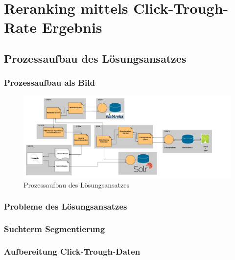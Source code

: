 %
\chapter{Reranking mittels Click-Trough-Rate Ergebnis}
\label{sec:Reranking}


\section{Prozessaufbau des Lösungsansatzes}
\label{sec:Reranking:Prozessaufbau}

\subsection{Prozessaufbau als Bild}
\label{sec:Reranking:Prozessaufbau:ProzessaufbauBild}

\begin{figure}[H]
\centering
\includegraphics[width=0.5\linewidth]{gfx/Prozessaufbau}
\caption[Prozessaufbau des Lösungsansatzes]{Prozessaufbau des Lösungsansatzes}
\label{fig:Prozessaufbau}
\vspace{-2.5em}
\end{figure}

\subsection{Probleme des Lösungsansatzes}
\label{sec:Reranking:Prozessaufbau}

\subsection{Suchterm Segmentierung}
\label{sec:Reranking:Prozessaufbau:SuchtermSegmentierung}

\subsection{Aufbereitung Click-Trough-Daten}
\label{sec:Reranking:Prozessaufbau:Click-Trough-Daten}

